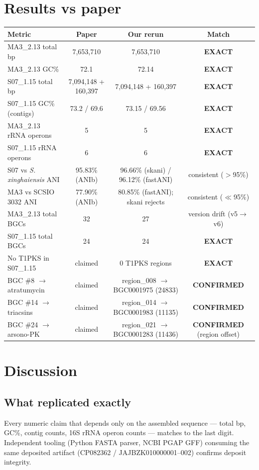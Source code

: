 \documentclass[11pt,letterpaper]{article}
\begin{document}
\section{Results vs paper}
\begin{longtable}{lccc}
\toprule
Metric & Paper & Our rerun & Match \\
\midrule
\endhead
MA3\_2.13 total bp & 7{,}653{,}710 & 7{,}653{,}710 & \textbf{EXACT} \\
MA3\_2.13 GC\% & 72.1 & 72.14 & \textbf{EXACT} \\
S07\_1.15 total bp & 7{,}094{,}148 + 160{,}397 & 7{,}094{,}148 + 160{,}397 & \textbf{EXACT} \\
S07\_1.15 GC\% (contigs) & 73.2 / 69.6 & 73.15 / 69.56 & \textbf{EXACT} \\
MA3\_2.13 rRNA operons & 5 & 5 & \textbf{EXACT} \\
S07\_1.15 rRNA operons & 6 & 6 & \textbf{EXACT} \\
S07 vs \textit{S. xinghaiensis} ANI & 95.83\% (ANIb) & 96.66\% (skani) / 96.12\% (fastANI) & consistent ($>$95\%) \\
MA3 vs SCSIO 3032 ANI & 77.90\% (ANIb) & 80.85\% (fastANI); skani rejects & consistent ($\ll$95\%) \\
MA3\_2.13 total BGCs & 32 & 27 & version drift (v5$\rightarrow$v6) \\
S07\_1.15 total BGCs & 24 & 24 & \textbf{EXACT} \\
No T1PKS in S07\_1.15 & claimed & 0 T1PKS regions & \textbf{EXACT} \\
BGC \#8 $\rightarrow$ atratumycin & claimed & region\_008 $\rightarrow$ BGC0001975 (24833) & \textbf{CONFIRMED} \\
BGC \#14 $\rightarrow$ triacsins & claimed & region\_014 $\rightarrow$ BGC0001983 (11135) & \textbf{CONFIRMED} \\
BGC \#24 $\rightarrow$ arsono-PK & claimed & region\_021 $\rightarrow$ BGC0001283 (11436) & \textbf{CONFIRMED} (region offset) \\
\bottomrule
\end{longtable}

\section{Discussion}
\subsection{What replicated exactly}
Every numeric claim that depends only on the assembled sequence --- total bp, GC\%, contig counts, 16S rRNA operon counts --- matches to the last digit. Independent tooling (Python FASTA parser, NCBI PGAP GFF) consuming the same deposited artifact (CP082362 / JAJBZK010000001--002) confirms deposit integrity.
\end{document}

